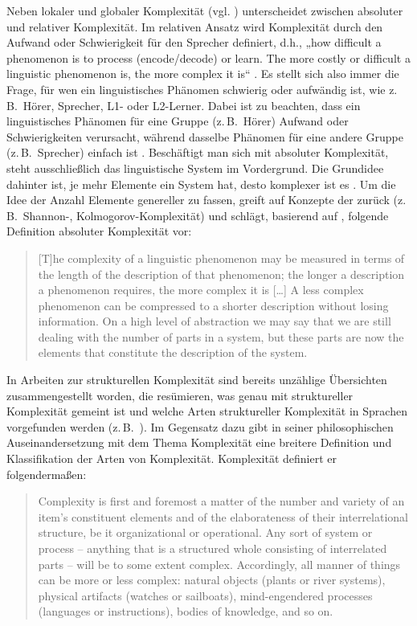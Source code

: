 Neben lokaler und globaler Komplexität (vgl. ) unterscheidet \citet{Miestamo2008} zwischen absoluter und relativer Komplexität. Im relativen Ansatz wird Komplexität durch den Aufwand oder Schwierigkeit für den Sprecher definiert, d.h., „how difficult a phenomenon is to process (encode/decode) or learn. The more costly or difficult a linguistic phenomenon is, the more complex it is“ \citep[25]{Miestamo2008}. Es stellt sich also immer die Frage, für wen ein linguistisches Phänomen schwierig oder aufwändig ist, wie z.\,B.\ Hörer, Sprecher, L1- oder L2-Ler\-ner. Dabei ist zu beachten, dass ein linguistisches Phänomen für eine Gruppe (z.\,B.\ Hörer) Aufwand oder Schwierigkeiten verursacht, während dasselbe Phänomen für eine andere Gruppe (z.\,B.\ Sprecher) einfach ist \citep[25]{Miestamo2008}. Beschäftigt man sich mit absoluter Komplexität, steht ausschließlich das linguistische System im Vordergrund. Die Grundidee dahinter ist, je mehr Elemente ein System hat, desto komplexer ist es \citep[24]{Miestamo2008}. Um die Idee der Anzahl Elemente genereller zu fassen, greift \citet{Miestamo2008} auf Konzepte der  zurück (z.\,B.\ Shannon-, Kolmogorov-Komplexität) und schlägt, basierend auf \citet{Dahl2004}, folgende Definition absoluter Komplexität vor:

\begin{quote}
[T]he complexity of a linguistic phenomenon may be measured in terms of the length of the description of that phenomenon; the longer a description a phenomenon requires, the more complex it is […] A less complex phenomenon can be compressed to a shorter description without losing information. On a high level of abstraction we may say that we are still dealing with the number of parts in a system, but these parts are now the elements that constitute the description of the system. \citep[24--25]{Miestamo2008}
\end{quote}

In Arbeiten zur strukturellen Komplexität sind bereits unzählige Übersichten zusammengestellt worden, die resümieren, was genau mit struktureller Komplexität gemeint ist und welche Arten struktureller Komplexität in Sprachen vorgefunden werden (z.\,B.\ \citealt[10--12]{SzmrecsanyiKortmann2012}). Im Gegensatz dazu gibt \citet{Rescher1998} in seiner philosophischen Auseinandersetzung mit dem Thema Komplexität eine breitere Definition und Klassifikation der Arten von Komplexität. Komplexität definiert er folgendermaßen:

\begin{quote}
Complexity is first and foremost a matter of the number and variety of an item’s constituent elements and of the elaborateness of their interrelational structure, be it organizational or operational. Any sort of system or process – anything that is a structured whole consisting of interrelated parts – will be to some extent complex. Accordingly, all manner of things can be more or less complex: natural objects (plants or river systems), physical artifacts (watches or sailboats), mind-engendered processes (languages or instructions), bodies of knowledge, and so on. \citep[1]{Rescher1998}
\end{quote}

